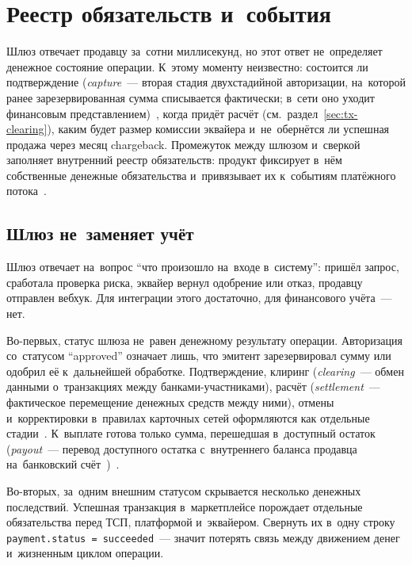 
\chapter{Реестр обязательств и~события}\label{ch:internal-ledger}

Шлюз отвечает продавцу за~сотни миллисекунд, но этот ответ не~определяет
денежное состояние операции. К~этому моменту неизвестно: состоится ли
подтверждение (\textit{capture}~--- вторая стадия двухстадийной
  авторизации, на~которой ранее зарезервированная сумма списывается
фактически; в~сети оно уходит финансовым представлением)~\cite{stripe-manual-capture,adyen-glossary}, когда придёт расчёт
(см.~раздел~\ref{sec:tx-clearing}), каким будет размер комиссии эквайера
и~не~обернётся ли успешная продажа через месяц chargeback. Промежуток между шлюзом
и~сверкой заполняет внутренний реестр обязательств: продукт фиксирует в~нём
собственные денежные обязательства и~привязывает их к~событиям платёжного
потока~\cite{visa-core-rules,mc-tpr,stripe-manual-capture}.

\section{Шлюз не~заменяет учёт}\label{sec:ledger-why}

Шлюз отвечает на~вопрос \enquote{что произошло на~входе в~систему}: пришёл
запрос, сработала проверка риска, эквайер вернул одобрение или отказ, продавцу
отправлен вебхук. Для интеграции этого достаточно, для финансового учёта~---
нет.

Во-первых, статус шлюза не~равен денежному результату операции. Авторизация
со~статусом \enquote{approved} означает лишь, что эмитент зарезервировал сумму
или одобрил её к~дальнейшей обработке. Подтверждение, клиринг
(\textit{clearing}~--- обмен данными о~транзакциях между банками-участниками),
расчёт (\textit{settlement}~--- фактическое перемещение денежных средств между
ними), отмены и~корректировки в~правилах
карточных сетей оформляются как отдельные стадии~\cite{mc-switching-services}.
К~выплате готова только сумма, перешедшая в~доступный остаток
(\textit{payout}~--- перевод доступного остатка с~внутреннего баланса продавца
на~банковский счёт~\cite{stripe-payouts})~\cite{visa-core-rules,mc-tpr,stripe-manual-capture,stripe-balances}.

Во-вторых, за~одним внешним статусом скрывается несколько денежных последствий.
Успешная транзакция в~маркетплейсе порождает отдельные обязательства перед ТСП,
платформой и~эквайером. Свернуть их в~одну строку \texttt{payment.status =
succeeded}~--- значит потерять связь между движением денег
и~жизненным циклом операции.


